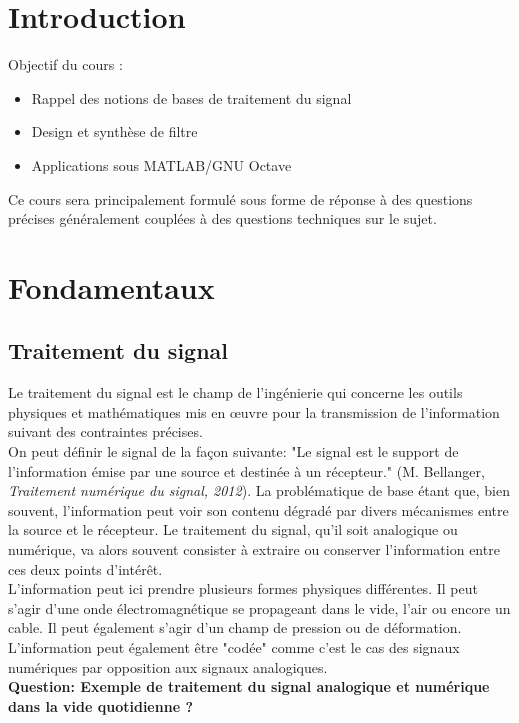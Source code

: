 \documentclass[11pt,a4paper]{article}
\begin{document}
\tableofcontents

\section*{Introduction}
Objectif du cours : 
\begin{itemize}
\item Rappel des notions de bases de traitement du signal 
\item Design et synthèse de filtre 
\item Applications sous MATLAB/GNU Octave
\end{itemize}

Ce cours sera principalement formulé sous forme de réponse à des questions précises généralement couplées à des questions techniques sur le sujet.

\section{Fondamentaux}
\subsection{Traitement du signal}
Le traitement du signal est le champ de l'ingénierie qui concerne les outils physiques et mathématiques mis en œuvre pour la transmission de l'information suivant des contraintes précises.\\

On peut définir le signal de la façon suivante: "Le signal est le support de l’information émise par une source et destinée à un récepteur." (M. Bellanger, \textit{Traitement numérique du signal, 2012}). La problématique de base étant que, bien souvent, l'information peut voir son contenu dégradé par divers mécanismes entre la source et le récepteur. Le traitement du signal, qu'il soit analogique ou numérique, va alors souvent consister à extraire ou conserver l'information entre ces deux points d'intérêt.\\

L'information peut ici prendre plusieurs formes physiques différentes. Il peut s'agir d'une onde électromagnétique se propageant dans le vide, l'air ou encore un cable. Il peut également s'agir d'un champ de pression ou de déformation. L'information peut également être "codée" comme c'est le cas des signaux numériques par opposition aux signaux analogiques.\\

\textbf{Question: Exemple de traitement du signal analogique et numérique dans la vide quotidienne ?}\\
\end{document}
